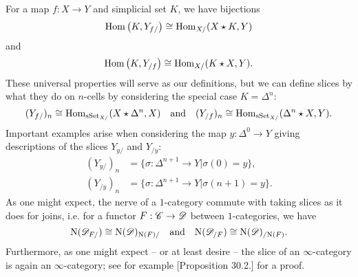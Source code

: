 \documentclass[../../thesis.tex]{subfiles}
\begin{document}
For a map $f:X\to Y$ and simplicial set $K$, we have bijections
\[
    \mathrm{Hom}\left(K, Y_{f /}\right) \cong \mathrm{Hom}_{X /}(X \star K, Y)
\]
and
\[
    \mathrm{Hom}\left(K, Y_{/ f}\right) \cong \mathrm{Hom}_{X /}(K \star X, Y).
\]
These universal properties will serve as our definitions, but we can define slices by what they do on $n$-cells by considering the special case $K=\Delta^n$:
\[
    (Y_{f/})_n \cong \mathrm{Hom}_{\mathrm{sSet}_{X/}}(X\star \Delta^n, X) \quad \text{and} \quad    (Y_{/f})_n \cong \mathrm{Hom}_{\mathrm{sSet}_{X/}}(\Delta^n\star X, Y).
\]
Important examples arise when considering the map $y: \Delta^0\to Y$ giving descriptions of the slices $Y_{y/}$ and $Y_{/y}$:
\begin{align*}
    (Y_{y/})_n & = \{ \sigma : \Delta^{n+1} \to Y | \sigma(0) = y\},   \\
    (Y_{/y})_n & = \{ \sigma : \Delta^{n+1} \to Y | \sigma(n+1) = y\}.
\end{align*}
As one might expect, the nerve of a $1$-category commute with taking slices as it does for joins, i.e. for a functor $F: \mathscr{C} \to \mathscr{D}$ between $1$-categories, we have
\[
    \mathrm{N}(\mathscr{D}_{F/}) \cong \mathrm{N}(\mathscr{D})_{\mathrm{N}(F)/}\quad \text{and} \quad \mathrm{N}(\mathscr{D}_{/F}) \cong \mathrm{N}(\mathscr{D})_{/\mathrm{N}(F)}.
\]
Furthermore, as one might expect -- or at least desire -- the slice of an $\infty$-category is again an $\infty$-category; see for example \cite{Rezk}[Proposition 30.2.] for a proof.
\end{document}
